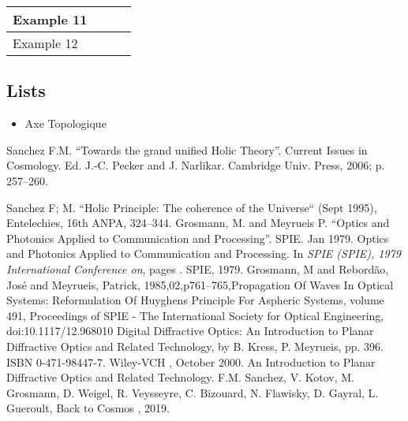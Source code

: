 \documentclass{article}
\begin{document}
\begin{table}[]
\begin{tabular}{|l|l|l|l|}
Example 11  &                                                                                                                                             &                                                                                                                                       &                                                                                               \\ \hline
Example 12  &                                                                                                                                             &                                                                                                                                       &                                                                                               \\ \hline
\end{tabular}
\end{table}

\subsection{Lists}

\begin{itemize}
\item Axe Topologique
\end{itemize}


  


\begin{thebibliography}{1}

 Sanchez F.M. ``Towards the grand unified Holic Theory''. Current
Issues in Cosmology. Ed. J.-C. Pecker and J. Narlikar. Cambridge Univ. Press,
2006; p. 257--260.

 Sanchez F; M. ``Holic Principle: The coherence of the Universe`` (Sept 1995), Entelechies, 16th ANPA, 324--344.
 Grosmann, M. and Meyrueis P. ``Optics and Photonics Applied to Communication and Processing''. SPIE.  Jan 1979.
\newblock Optics and Photonics Applied to Communication and Processing.
\newblock In {\em SPIE (SPIE), 1979 
  International Conference on}, pages . SPIE, 1979.
 Grosmann, M and Rebordão, José and Meyrueis, Patrick, 1985,02,p761--765,Propagation Of Waves In Optical Systems: Reformulation Of Huyghens Principle For Aspheric Systems,
volume 491, Proceedings of SPIE - The International Society for Optical Engineering, doi:10.1117/12.968010
 Digital Diffractive Optics: An Introduction to Planar Diffractive Optics and Related Technology, by B. Kress, P. Meyrueis, pp. 396. ISBN 0-471-98447-7. Wiley-VCH , October 2000.
\newblock An Introduction to Planar Diffractive Optics and Related Technology.
 F.M. Sanchez, V. Kotov, M. Grosmann, D. Weigel, R. Veysseyre, C. Bizouard, N. Flawisky, D. Gayral, L. Gueroult, Back to Cosmos
, 2019.
\end{thebibliography}
\end{document}
